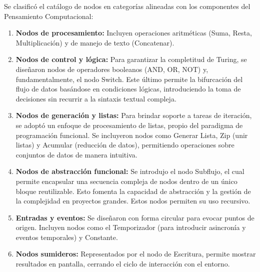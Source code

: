 Se clasificó el catálogo de nodos en categorías alineadas con los componentes del Pensamiento Computacional:

\begin{enumerate}
    \item \textbf{Nodos de procesamiento:} Incluyen operaciones aritméticas (Suma, Resta, Multiplicación) y de manejo de texto (Concatenar).
    \item \textbf{Nodos de control y lógica:} Para garantizar la completitud de Turing, se diseñaron nodos de operadores booleanos (AND, OR, NOT) y, fundamentalmente, el nodo Switch. Este último permite la bifurcación del flujo de datos basándose en condiciones lógicas, introduciendo la toma de decisiones sin recurrir a la sintaxis textual compleja.
    \item \textbf{Nodos de generación y listas:} Para brindar soporte a tareas de iteración, se adoptó un enfoque de procesamiento de listas, propio del paradigma de programación funcional. Se incluyeron nodos como Generar Lista, Zip (unir listas) y Acumular (reducción de datos), permitiendo operaciones sobre conjuntos de datos de manera intuitiva.
    \item \textbf{Nodos de abstracción funcional:} Se introdujo el nodo Subflujo, el cual permite encapsular una secuencia compleja de nodos dentro de un único bloque reutilizable. Esto fomenta la capacidad de abstracción y la gestión de la complejidad en proyectos grandes. Estos nodos permiten su uso recursivo.
    \item \textbf{Entradas y eventos:} Se diseñaron con forma circular para evocar puntos de origen. Incluyen nodos como el Temporizador (para introducir asincronía y eventos temporales) y Constante.
    \item \textbf{Nodos sumideros:} Representados por el nodo de Escritura, permite mostrar resultados en pantalla, cerrando el ciclo de interacción con el entorno.
\end{enumerate}
